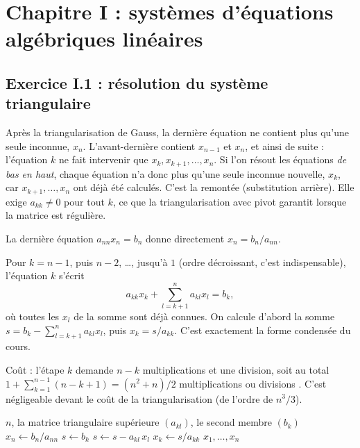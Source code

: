 \chapter{Chapitre I : systèmes d'équations algébriques linéaires}

\section{Exercice I.1 : résolution du système triangulaire}


\Pourquoi Après la triangularisation de Gauss, la dernière équation ne
contient plus qu'une seule inconnue, $x_n$. L'avant-dernière contient $x_{n-1}$
et $x_n$, et ainsi de suite : l'équation $k$ ne fait intervenir que
$x_k, x_{k+1}, \dots, x_n$. Si l'on résout les équations \emph{de bas en
haut}, chaque équation n'a donc plus qu'une seule inconnue nouvelle, $x_k$, car
$x_{k+1}, \dots, x_n$ ont déjà été calculés. C'est la \og remontée \fg{}
(substitution arrière). Elle exige $a_{kk} \neq 0$ pour tout $k$, ce que la
triangularisation avec pivot garantit lorsque la matrice est régulière.

\Etapes
{} La dernière équation $a_{nn}x_n = b_n$ donne directement
$x_n = b_n/a_{nn}$.

 Pour $k = n-1$, puis $n-2$, \dots, jusqu'à $1$ (ordre décroissant,
c'est indispensable), l'équation $k$ s'écrit
\[
  a_{kk}x_k + \sum_{l=k+1}^{n} a_{kl}x_l = b_k ,
\]
où toutes les $x_l$ de la somme sont déjà connues. On calcule d'abord la somme
$s = b_k - \sum_{l=k+1}^{n} a_{kl}x_l$, puis $x_k = s/a_{kk}$. C'est
exactement la forme condensée du cours.

 Coût : l'étape $k$ demande $n-k$ multiplications et une division, soit
au total $1 + \sum_{k=1}^{n-1}(n-k+1) = (n^2+n)/2$ multiplications ou divisions
. C'est négligeable devant le coût de la triangularisation (de
l'ordre de $n^3/3$).

\begin{algo}[ : remontée]
  \Require $n$, la matrice triangulaire supérieure $(a_{kl})$, le second membre $(b_k)$
  \State $x_n \leftarrow b_n / a_{nn}$
    \State $s \leftarrow b_k$
      \State $s \leftarrow s - a_{kl}\,x_l$
    \EndFor
    \State $x_k \leftarrow s / a_{kk}$
  \EndFor
  \Print $x_1, \dots, x_n$
\end{algo}

